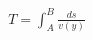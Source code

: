 \documentclass[preview]{standalone}
\begin{document}
\begin{align*}
T = \int_{A}^{B} \frac{ds}{v(y)}
\end{align*}
\end{document}

